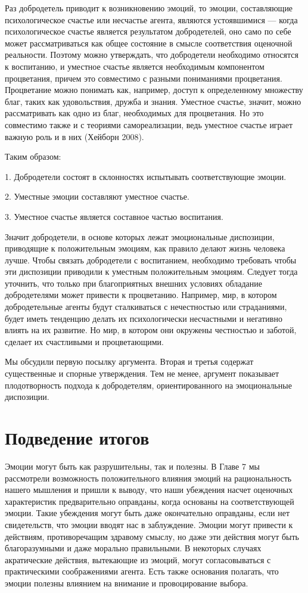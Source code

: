 \documentclass[11pt]{book}
\begin{document}
Раз добродетель приводит к возникновению эмоций, то эмоции, составляющие психологическое счастье или несчастье агента, являются устоявшимися --- когда психологическое счастье является результатом добродетелей, оно само по себе может рассматриваться как общее состояние в смысле соответствия оценочной реальности. Поэтому можно утверждать, что добродетели необходимо относятся к воспитанию, и уместное счастье является необходимым компонентом процветания, причем это совместимо с разными пониманиями процветания. Процветание можно понимать как, например, доступ к определенному множеству благ, таких как удовольствия, дружба и знания. Уместное счастье, значит, можно рассматривать как одно из благ, необходимых для процветания. Но это совместимо также и с теориями самореализации, ведь уместное счастье играет важную роль и в них (Хейборн 2008).

Таким образом:

1. Добродетели состоят в склонностях испытывать соответствующие эмоции.

2. Уместные эмоции составляют уместное счастье.

3. Уместное счастье является составное частью воспитания.

Значит добродетели, в основе которых лежат эмоциональные диспозиции, приводящие к положительным эмоциям, как правило делают жизнь человека лучше. Чтобы связать добродетели с воспитанием, необходимо требовать чтобы эти диспозиции приводили к уместным положительным эмоциям. Следует тогда уточнить, что только при благоприятных внешних условиях обладание добродетелями может привести к процветанию. Например, мир, в котором добродетельные агенты будут сталкиваться с нечестностью или страданиями, будет иметь тенденцию делать их психологически несчастными и негативно влиять на их развитие. Но мир, в котором они окружены честностью и заботой, сделает их счастливыми и процветающими.

Мы обсудили первую посылку аргумента. Вторая и третья содержат существенные и спорные утверждения. Тем не менее, аргумент показывает плодотворность подхода к добродетелям, ориентированного на эмоциональные диспозиции.

\section{Подведение итогов}

Эмоции могут быть как разрушительны, так и полезны. В Главе 7 мы рассмотрели возможность положительного влияния эмоций на рациональность нашего мышления и пришли к выводу, что наши убеждения насчет оценочных характеристик предварительно оправданы, когда основаны на соответствующей эмоции. Такие убеждения могут быть даже окончательно оправданы, если нет свидетельств, что эмоции вводят нас в заблуждение. Эмоции могут привести к действиям, противоречащим здравому смыслу, но даже эти действия могут быть благоразумными и даже морально правильными. В некоторых случаях акратические действия, вытекающие из эмоций, могут согласовываться с практическими соображениями агента. Есть также основания полагать, что эмоции полезны влиянием на внимание и провоцирование выбора.
\end{document}
